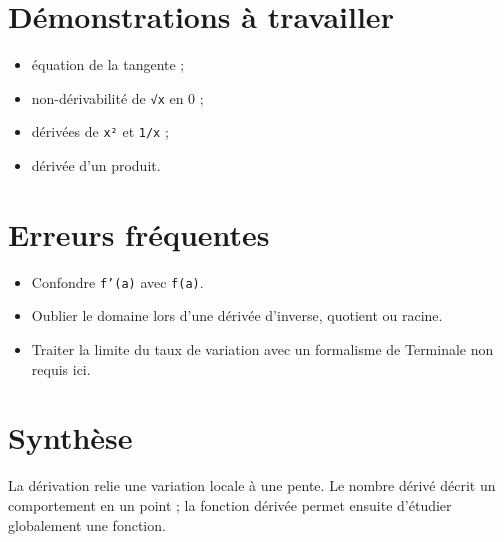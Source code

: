 \section{Démonstrations à travailler}
\begin{itemize}
\item équation de la tangente ;
\item non-dérivabilité de \texttt{√x} en 0 ;
\item dérivées de \texttt{x²} et \texttt{1/x} ;
\item dérivée d'un produit.
\end{itemize}

\section{Erreurs fréquentes}
\begin{itemize}
\item Confondre \texttt{f'(a)} avec \texttt{f(a)}.
\item Oublier le domaine lors d'une dérivée d'inverse, quotient ou racine.
\item Traiter la limite du taux de variation avec un formalisme de Terminale non requis ici.
\end{itemize}

\section{Synthèse}
La dérivation relie une variation locale à une pente. Le nombre dérivé décrit un comportement en un point ; la fonction dérivée permet ensuite d'étudier globalement une fonction.
